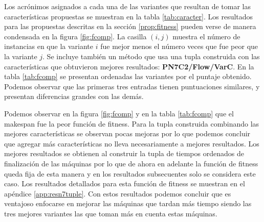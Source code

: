 Los acrónimos asignados a cada una de las variantes que resultan de tomar las características propuestas se muestran en la tabla \ref{tab:caracter}.
%
Los resultados para las propuestas descritas en la sección \ref{prop:fitness} pueden verse de manera condensada en la figura \ref{fig:fcomp}. 
%
La casilla $(i,j)$ muestra el número de instancias en que la variante $i$ fue mejor menos el número veces que fue peor que la variante $j$.
%
Se incluye también un método que usa una tupla construida con las características que obtuvieron mejores resultados: \textbf{PN7C2/Flow/VarC}. 
%
En la tabla \ref{tab:fcomp} se presentan ordenadas las variantes por el puntaje obtenido. 
%
Podemos observar que las primeras tres entradas tienen puntuaciones similares, y presentan diferencias grandes con las demás.

Podemos observar en la figura \ref{fig:fcomp} y en la tabla \ref{tab:fcomp} que el makespan fue la peor función de fitness. 
%
Para la tupla construida combinando las mejores características se observan pocas mejoras por lo que podemos concluir que agregar más características no lleva necesariamente a mejores resultados. Los mejores resultados se obtienen al construir la tupla de tiempos ordenados de finalización de las máquinas por lo que de ahora en adelante la función de fitness queda fija de esta manera y en los resultados subsecuentes solo se considera este caso. Los resultados detallados para esta función de fitness se muestran en el apéndice \ref{app:resn7tuple}.
Con estos resultados podemos concluir que es ventajoso enfocarse en mejorar las máquinas que tardan más tiempo siendo las tres mejores variantes las que toman más en cuenta estas máquinas.


